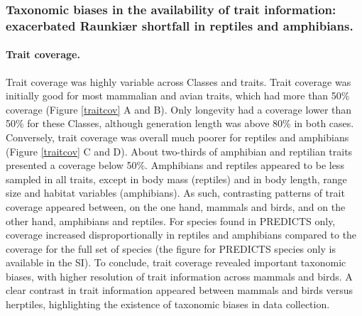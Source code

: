 \subsubsection{Taxonomic biases in the availability of trait information: exacerbated Raunki{\ae}r shortfall in reptiles and amphibians.}

\paragraph{Trait coverage.}
Trait coverage was highly variable across Classes and traits. Trait coverage was initially good for most mammalian and avian traits, which had more than 50\% coverage (Figure \ref{traitcov} A and B). Only longevity had a coverage lower than 50\% for these Classes, although generation length was above 80\% in both cases. Conversely, trait coverage was overall much poorer for reptiles and amphibians (Figure \ref{traitcov} C and D). About two-thirds of amphibian and reptilian traits presented a coverage below 50\%.  Amphibians and reptiles appeared to be less sampled in all traits, except in body mass (reptiles) and in body length, range size and habitat variables (amphibians).  As such, contrasting patterns of trait coverage appeared between, on the one hand, mammals and birds, and on the other hand, amphibians and reptiles. For species found in PREDICTS only, coverage increased disproportionally in reptiles and amphibians compared to the coverage for the full set of species (the figure for PREDICTS species only is available in the SI). To conclude, trait coverage revealed important taxonomic biases, with higher resolution of trait information across mammals and birds. A clear contrast in trait information appeared between mammals and birds versus herptiles, highlighting the existence of taxonomic biases in data collection.



